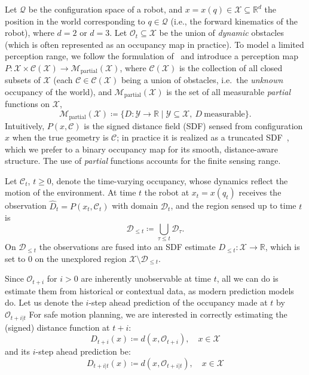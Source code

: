 \documentclass[lettersize,journal]{IEEEtran}
\begin{document}
Let $\mathcal{Q}$ be the configuration space of a robot, and  $x = x(q) \in \mathcal{X} \subseteq \mathbb{R}^d$ the position in the world corresponding to $q\in \mathcal{Q}$ (i.e., the forward kinematics of the robot), where $d = 2$ or $d=3$. Let $\mathcal{O}_t \subseteq \mathcal{X}$ be the union of \emph{dynamic} obstacles (which is often represented as an occupancy map in practice).
To model a limited perception range, we follow the formulation of~\cite{janson2018safe} and introduce a perception map $P : \mathcal{X} \times \mathscr{C}(\mathcal{X}) \to \mathscr{M}_{\text{partial}}(\mathcal{X})$, where $\mathscr{C}(\mathcal{X})$ is the collection of all closed subsets of $\mathcal{X}$ (each $\mathcal{C} \in \mathscr{C}(\mathcal{X})$ being a union of obstacles, i.e.\ the \emph{unknown} occupancy of the world), and $\mathscr{M}_{\text{partial}}(\mathcal{X})$ is the set of all measurable \emph{partial} functions on $\mathcal{X}$,
\begin{equation*}
\mathscr{M}_{\text{partial}}(\mathcal{X}) \coloneqq \bigl\{ D : \mathcal{Y} \to \mathbb{R} \;\big|\; \mathcal{Y}\subseteq\mathcal{X},\ D\ \text{measurable} \bigr\}.
\end{equation*}
Intuitively, $P(x, \mathcal{C})$ is the signed distance field (SDF) sensed from configuration $x$ when the true geometry is $\mathcal{C}$; in practice it is realized as a truncated SDF~\cite{newcombe2011kinectfusion}, which we prefer to a binary occupancy map for its smooth, distance-aware structure. The use of \emph{partial} functions accounts for the finite sensing range.

Let $\mathcal{C}_t$, $t \geq 0$, denote the time-varying occupancy, whose dynamics reflect the motion of the environment. At time $t$ the robot at $x_t = x(q_t)$ receives the observation $\widehat{D}_t = P(x_t, \mathcal{C}_t)$ with domain $\mathcal{D}_t$, and the region sensed up to time $t$ is
\begin{equation*}
\mathcal{D}_{\leq t} \coloneqq \bigcup_{\tau \leq t}\mathcal{D}_{\tau}.
\end{equation*}
On $\mathcal{D}_{\leq t}$ the observations are fused into an SDF estimate $D_{\leq t}: \mathcal{X} \to \mathbb{R}$, which is set to $0$ on the unexplored region $\mathcal{X} \setminus \mathcal{D}_{\leq t}$.



Since $\mathcal{O}_{t+i}$ for $i > 0$ are inherently unobservable at time $t$, all we can do is estimate them from historical or contextual data, as modern prediction models do. Let us denote the $i$-step ahead prediction of the occupancy made at $t$ by $\mathcal{O}_{t+i|t}$ 
For safe motion planning, we are interested in correctly estimating the (signed) distance function at $t+i$:
\begin{equation*}
D_{t+i}(x) \coloneqq d(x, \mathcal{O}_{t+i}), \quad x \in \mathcal{X}
\end{equation*}
and its $i$-step ahead prediction be:
\begin{equation*}
D_{t+i|t}(x) \coloneqq d(x, \mathcal{O}_{t+i|t}), \quad x \in \mathcal{X}
\end{equation*}
\end{document}
